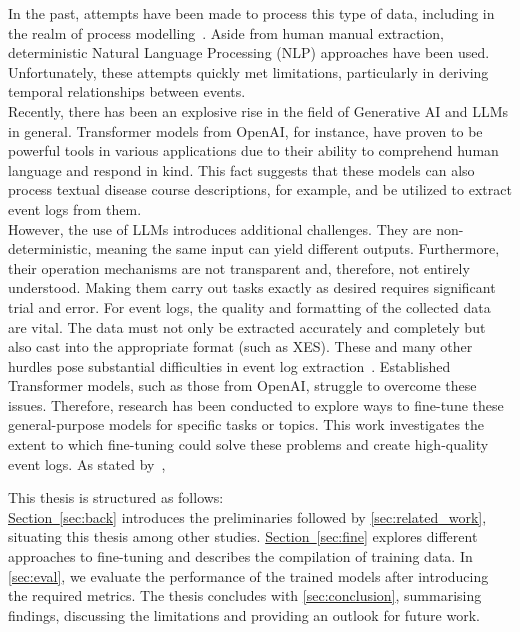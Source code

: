 In the past, attempts have been made to process this type of data, including in the realm of process modelling~\cite{friedrich_process_2011}. Aside from human manual extraction,  deterministic Natural Language Processing (NLP) approaches have been used. Unfortunately, these attempts quickly met limitations, particularly in deriving temporal relationships between events.\\
Recently, there has been an explosive rise in the field of Generative AI and LLMs in general. Transformer models from OpenAI, for instance, have proven to be powerful tools in various applications due to their ability to comprehend human language and respond in kind. This fact suggests that these models can also process textual disease course descriptions, for example, and be utilized to extract event logs from them.\\
However, the use of LLMs introduces additional challenges. They are non-deterministic, meaning the same input can yield different outputs. Furthermore, their operation mechanisms are not transparent and, therefore, not entirely understood. Making them carry out tasks exactly as desired requires significant trial and error. For event logs, the quality and formatting of the collected data are vital. The data must not only be extracted accurately and completely but also cast into the appropriate format (such as XES).
These and many other hurdles pose substantial difficulties in event log extraction~\cite{munoz-gama_process_2022}. Established Transformer models, such as those from OpenAI, struggle to overcome these issues. Therefore, research has been conducted to explore ways to fine-tune these general-purpose models for specific tasks or topics. This work investigates the extent to which fine-tuning could solve these problems and create high-quality event logs. As stated by~\cite{latif_fine-tuning_2024}, 
\begin{quote}
\end{quote}

This thesis is structured as follows:\\
\hyperref[sec:back]{Section~\ref*{sec:back}} introduces the preliminaries followed by \autoref{sec:related_work}, situating this thesis among other studies. \hyperref[sec:fine]{Section~\ref*{sec:fine}} explores different approaches to fine-tuning and describes the compilation of training data. In \autoref{sec:eval}, we evaluate the performance of the trained models after introducing the required metrics. The thesis concludes with \autoref{sec:conclusion}, summarising findings, discussing the limitations and providing an outlook for future work.